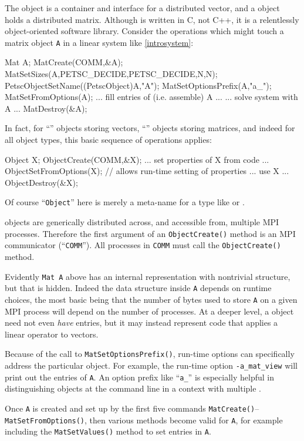 The \pVec object is a container and interface for a distributed vector, and a \pMat object holds a distributed matrix.  Although \PETSc is written in C, not C++, it is a relentlessly object-oriented software library.  Consider the operations which might touch a matrix object \texttt{A} in a linear system like \eqref{introsystem}:
\begin{code}
Mat A;
MatCreate(COMM,&A);
MatSetSizes(A,PETSC_DECIDE,PETSC_DECIDE,N,N);
PetscObjectSetName((PetscObject)A,"A");
MatSetOptionsPrefix(A,"a_");
MatSetFromOptions(A);
... fill entries of (i.e. assemble) A ...
... solve system with A ...
MatDestroy(&A);
\end{code}
In fact, for ``\pVec'' objects storing vectors, ``\pMat'' objects storing matrices, and indeed for all \PETSc object types, this basic sequence of operations applies:
\begin{code}
Object X;
ObjectCreate(COMM,&X);
... set properties of X from code ...
ObjectSetFromOptions(X);  // allows run-time setting of properties
... use X ...
ObjectDestroy(&X);
\end{code}
Of course ``\texttt{Object}'' here is merely a meta-name for a \PETSc type like \pVec or \pMat.

\PETSc objects are generically distributed across, and accessible from, multiple MPI processes.  Therefore the first argument of an \texttt{ObjectCreate()} method is an MPI communicator (``\texttt{COMM}'').  All processes in \texttt{COMM} must call the \texttt{ObjectCreate()} method.

Evidently \texttt{Mat A} above has an internal representation with nontrivial structure, but that is hidden.  Indeed the data structure inside \texttt{A} depends on runtime choices, the most basic being that the number of bytes used to store \texttt{A} on a given MPI process will depend on the number of processes.  At a deeper level, a \PETSc \pMat object need not even \emph{have} entries, but it may instead represent code that applies a linear operator to vectors.

Because of the call to \texttt{MatSetOptionsPrefix()}, run-time options can specifically address the particular \pMat object.  For example, the run-time option \texttt{-a\_mat\_view} will print out the entries of \texttt{A}.  An option prefix like ``\texttt{a\_}'' is especially helpful in distinguishing \pMat objects at the command line in a context with multiple \pMats.

Once \texttt{A} is created and set up by the first five commands \texttt{MatCreate()}--\texttt{MatSetFromOptions()}, then various methods become valid for \texttt{A}, for example including the \texttt{MatSetValues()} method to set entries in \texttt{A}.


